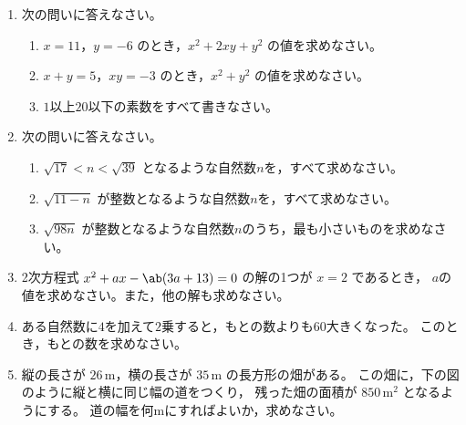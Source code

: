 \documentclass[titlepage,article,paper=b4,twocolumn]{jlreq}
\begin{document}
\begin{enumerate}[label=\arabic*.]
\item 次の問いに答えなさい。
\begin{enumerate}[label=(\arabic*)]
\setlength{\labelsep}{\zw}
\item $x = 11$，$y = -6$ のとき，${x}^{2} + 2xy + {y}^{2}$ の値を求めなさい。
\vspace{5mm}
\item $x + y = 5$，$xy = -3$ のとき，${x}^{2} + {y}^{2}$ の値を求めなさい。
\vspace{5mm}
\item $1$以上$20$以下の素数をすべて書きなさい。
\vspace{5mm}
\end{enumerate}
\vfill


\item 次の問いに答えなさい。
\begin{enumerate}[label=(\arabic*)]
\setlength{\labelsep}{\zw}
\item $\sqrt{17} < n < \sqrt{39}$ となるような自然数$n$を，すべて求めなさい。
\vspace{5mm}
\item $\sqrt{11 - n}$ が整数となるような自然数$n$を，すべて求めなさい。
\vspace{5mm}
\item $\sqrt{98n}$ が整数となるような自然数$n$のうち，最も小さいものを求めなさい。
\vspace{5mm}
\end{enumerate}
\vfill


\item 2次方程式 ${x}^{2} + ax - \ab(3a + 13) = 0$ の解の1つが $x = 2$ であるとき，
$a$の値を求めなさい。また，他の解も求めなさい。
\vspace{5mm}
\vfill


\item ある自然数に$4$を加えて$2$乗すると，もとの数よりも$60$大きくなった。
このとき，もとの数を求めなさい。
\vfill\vfill
\newpage


\item 縦の長さが $26{\,}\textrm{m}$，横の長さが $35{\,}\textrm{m}$ の長方形の畑がある。
この畑に，下の図のように縦と横に同じ幅の道をつくり，
残った畑の面積が $850{\,}\textrm{m}^{2}$ となるようにする。
道の幅を何mにすればよいか，求めなさい。\vspace{5mm}


\end{enumerate}
\end{document}
